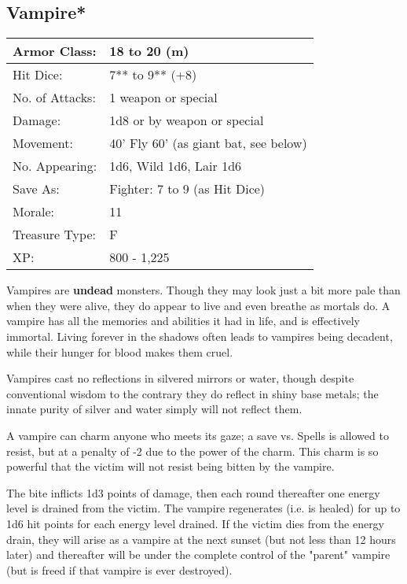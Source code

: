 \documentclass[a4paper,twoside,openany,10pt]{book}
\begin{document}
\begin{multicols}{2}
\subsection*{Vampire*}\label{vampire}

\begin{tabularx}{0.50\textwidth}{@{}lX@{}}
Armor Class: & 18 to 20 (m) \\\hline
Hit Dice: & 7** to 9** (+8) \\\hline
No. of Attacks: & 1 weapon or special \\\hline
Damage: & 1d8 or by weapon or special \\\hline
Movement: & 40' Fly 60' (as giant bat,
see below) \\\hline
No. Appearing: & 1d6, Wild 1d6, Lair 1d6 \\\hline
Save As: & Fighter: 7 to 9 (as Hit Dice) \\\hline
Morale: & 11 \\\hline
Treasure Type: & F \\\hline
XP: & 800 - 1,225 \\\hline
\end{tabularx}\medskip

Vampires are \textbf{undead} monsters. Though they may look just a bit more pale than when they were alive, they do appear to live and even breathe as mortals do. A vampire has all the memories and abilities it had in life, and is effectively immortal. Living forever in the shadows often leads to vampires being decadent, while their hunger for blood makes them cruel.

Vampires cast no reflections in silvered mirrors or water, though despite conventional wisdom to the contrary they do reflect in shiny base metals; the innate purity of silver and water simply will not reflect them.

A vampire can charm anyone who meets its gaze; a save vs. Spells is allowed to resist, but at a penalty of -2 due to the power of the charm. This charm is so powerful that the victim will not resist being bitten by the vampire.

The bite inflicts 1d3 points of damage, then each round thereafter one energy level is drained from the victim. The vampire regenerates (i.e. is healed) for up to 1d6 hit points for each energy level drained. If the victim dies from the energy drain, they will arise as a vampire at the next sunset (but not less than 12 hours later) and thereafter will be under the complete control of the "parent" vampire (but is freed if that vampire is ever destroyed).


\end{multicols}
\end{document}

